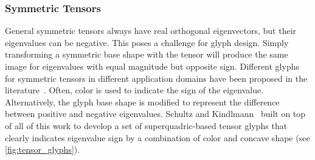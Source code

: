 \subsubsection{Symmetric Tensors} %
%
General symmetric tensors always have real orthogonal eigenvectors, but their
eigenvalues can be negative.
%
This poses a challenge for glyph design.
%
Simply transforming a symmetric base shape with the tensor will produce the same
image for eigenvalues with equal magnitude but opposite sign.
%
Different glyphs for symmetric tensors in different application domains have
been proposed in the literature~\cite{Pajevic1999,Hashash2003,Jeremic2002}.
%
Often, color is used to indicate the sign of the eigenvalue.
%
Alternatively, the glyph base shape is modified to represent the difference
between positive and negative eigenvalues.
%
Schultz and Kindlmann~\cite{Schultz2010a} built on top of all of this work to
develop a set of superquadric-based tensor glyphs that clearly indicates
eigenvalue sign by a combination of color and concave shape (see
\cref{fig:tensor_glyphs}).
%
%
%

